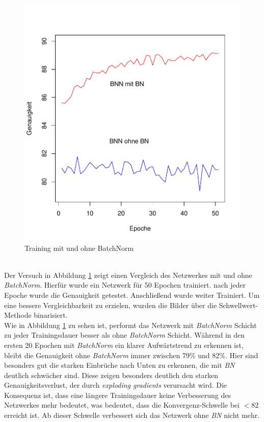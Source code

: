 \begin{figure}[h]
	\centering
	\includegraphics[scale=0.7]{./bilder/_plot_batchnorm}
	\caption{Training mit und ohne BatchNorm}
	\label{fig:bn}
\end{figure}\\
Der Versuch in Abbildung \ref{fig:bn} zeigt einen Vergleich des Netzwerkes mit und ohne \textit{BatchNorm}. Hierfür wurde ein Netzwerk für 50 Epochen trainiert. nach jeder Epoche wurde die Genauigkeit getestet. Anschließend wurde weiter Trainiert. Um eine bessere Vergleichbarkeit zu erzielen, wurden die Bilder über die Schwellwert-Methode binarisiert.\\

Wie in Abbildung \ref{fig:bn} zu sehen ist, performt das Netzwerk mit \textit{BatchNorm} Schicht zu jeder Trainingsdauer besser als ohne \textit{BatchNorm} Schicht. Während in den ersten 20 Epochen mit \textit{BatchNorm} ein klarer Aufwärtstrend zu erkennen ist, bleibt die Genauigkeit ohne \textit{BatchNorm} immer zwischen 79\% und 82\%. Hier sind besonders gut die starken Einbrüche nach Unten zu erkennen, die mit \textit{BN} deutlich schwächer sind. Diese zeigen besonders deutlich den starken Genauigkeitsverlust, der durch \textit{exploding gradients} verursacht wird. Die Konsequenz ist, dass eine längere Trainingsdauer keine Verbesserung des Netzwerkes mehr bedeutet, was bedeutet, dass die Konvergenz-Schwelle bei $< 82$ erreicht ist. Ab dieser Schwelle verbessert sich das Netzwerk ohne \textit{BN} nicht mehr.


